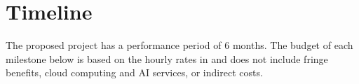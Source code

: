 \section{Timeline}
\label{sec:timeline}


The proposed project has a performance period of 6 months. 
The budget of each
milestone below is based on the hourly rates in  and does not
include fringe benefits, cloud computing and AI services, or indirect
costs.

